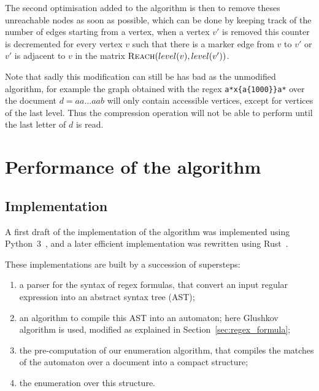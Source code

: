 \documentclass[12px]{article}
\theoremstyle{definition}
\begin{document}
        The second optimisation added to the algorithm is then to remove theses
        unreachable nodes as soon as possible, which can be done by keeping
        track of the number of edges starting from a vertex, when a vertex $v'$
        is removed this counter is decremented for every vertex $v$ such that
        there is a marker edge from $v$ to $v'$ or $v'$ is adjacent to $v$ in
        the matrix $\Call{Reach}{level(v), level(v')}$.

        Note that sadly this modification can still be has bad as the
        unmodified algorithm, for example the graph obtained with the regex
        \texttt{a*x\{a\{1000\}\}a*} over the document $d = aa \ldots aab$ will
        only contain accessible vertices, except for vertices of the last
        level.  Thus the compression operation will not be able to perform
        until the last letter of $d$ is read.

  \section{Performance of the algorithm}

    \subsection{Implementation}

      A first draft of the implementation of the algorithm was implemented
      using Python~3~\cite{implPython}, and a later efficient implementation
      was rewritten using Rust~\cite{implRust}.

      These implementations are built by a succession of supersteps:
      \begin{enumerate}
        \item a parser for the syntax of regex formulas, that convert an input
          regular expression into an abstract syntax tree (AST);
        \item an algorithm to compile this AST into an automaton; here
          Glushkov algorithm is used, modified as explained in
          Section~\ref{sec:regex_formula};
        \item the pre-computation of our enumeration algorithm, that compiles
          the matches of the automaton over a document into a compact
          structure;
        \item the enumeration over this structure.
      \end{enumerate}
\end{document}
